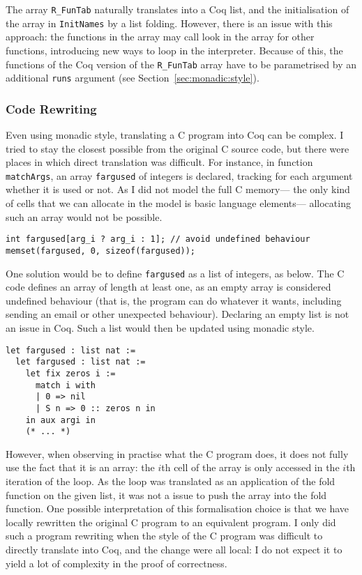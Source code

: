\documentclass{article}
\newcommand\Coq{Coq}
\newcommand\Cn{C}
\begin{document}
The array \texttt{R_FunTab} naturally translates
into a \Coq{} list,
and the initialisation of the array in \texttt{InitNames}
by a list folding.
However, there is an issue with this approach:
the functions in the array may call look in the array
for other functions,
introducing new ways to loop in the interpreter.
Because of this, the functions of the \Coq{} version
of the \texttt{R_FunTab} array have to be parametrised
by an additional \texttt{runs} argument
(see Section~\ref{sec:monadic:style}).


\subsubsection{Code Rewriting}
\label{sec:code:rewriting}

Even using monadic style,
translating a \Cn{} program into \Coq{} can be complex.
I tried to stay the closest possible from the original
\Cn{} source code,
but there were places in which direct translation was difficult.
For instance, in function \texttt{matchArgs},
an array \texttt{fargused} of integers is declared,
tracking for each argument whether it is used or not.
As I did not model the full \Cn{} memory—%
the only kind of cells that we can allocate in the model
is basic language elements—%
allocating such an array would not be possible.
\begin{verbatim}
int fargused[arg_i ? arg_i : 1]; // avoid undefined behaviour
memset(fargused, 0, sizeof(fargused));
\end{verbatim}

One solution would be to define \texttt{fargused}
as a list of integers, as below.
The \Cn{} code defines an array of length at least one,
as an empty array is considered undefined behaviour
(that is, the program can do whatever it wants,
including sending an email or other unexpected behaviour).
Declaring an empty list is not an issue in \Coq{}.
Such a list would then be updated using monadic style.
\begin{verbatim}
let fargused : list nat :=
  let fargused : list nat :=
    let fix zeros i :=
      match i with
      | 0 => nil
      | S n => 0 :: zeros n in
    in aux argi in
    (* ... *)
\end{verbatim}

However, when observing in practise what the \Cn{} program
does, it does not fully use the fact that it is an array:
the \(i\)th cell of the array is only accessed in the \(i\)th
iteration of the loop.
As the loop was translated as an application of the fold function
on the given list,
it was not a issue to push the array into the fold function.
One possible interpretation of this formalisation choice
is that we have locally rewritten the original \Cn{} program
to an equivalent program.
I only did such a program rewriting when the style of the \Cn{}
program was difficult to directly translate into \Coq{},
and the change were all local:
I do not expect it to yield a lot of complexity in the proof of correctness.
\end{document}
